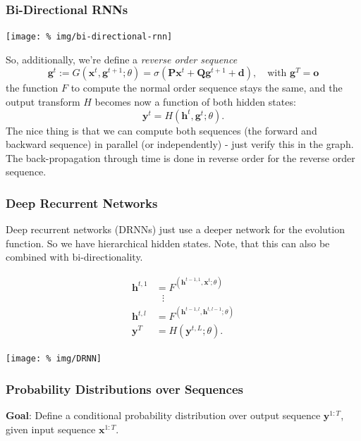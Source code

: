 \documentclass[a2paper,8pt]{extarticle}
\newcommand{\mat}[1]{\mathbf{#1}}
\renewcommand{\vec}[1]{\mathbf{#1}}
\newcommand{\vd}{\vec{d}}
\newcommand{\vg}{\vec{g}}
\newcommand{\vh}{\vec{h}}
\newcommand{\vo}{\vec{o}}
\newcommand{\vx}{\vec{x}}
\newcommand{\vy}{\vec{y}}
\newcommand{\MP}{\mat{P}}
\newcommand{\MQ}{\mat{Q}}
\begin{document}
\begin{landscape}
\begin{multicols*}{7}
\subsubsection{Bi-Directional RNNs}

\begin{center}
  \texttt{[image: \%
img/bi-directional-rnn]}
\end{center}

So, additionally, we're define a \emph{reverse order sequence}
\[
\vg^t:=G(\vx^t,\vg^{t+1};\theta)=\sigma(\MP\vx^t+\MQ\vg^{t+1}+\vd),
\quad\text{with }\vg^T=\vo
\]
the function $F$ to compute the normal order sequence stays the same, and the
output transform $H$ becomes now a function of both hidden states:
\[
\vy^t=H(\vh^t,\vg^t;\theta).
\]
The nice thing is that we can compute both sequences (the forward and backward
sequence) in parallel (or independently) - just verify this in the graph. The
back-propagation through time is done in reverse order for the reverse order
sequence.

\subsubsection{Deep Recurrent Networks}

Deep recurrent networks (DRNNs) just use a deeper network for the evolution
function. So we have hierarchical hidden states. Note, that this can also be
combined with bi-directionality.

\begin{multicols}{2}
\begin{align*}
\vh^{t,1}&=F^(\vh^{t-1,1},\vx^t;\theta)\\
&\,\,\,\,\vdots\\
\vh^{t,l}&=F^(\vh^{t-1,l},\vh^{t,l-1};\theta)\\
\vy^T&=H(\vy^{t,L};\theta).
\end{align*}
\begin{center}
  \texttt{[image: \%
img/DRNN]}
\end{center}
\end{multicols}





\subsubsection{Probability Distributions over Sequences}

\textbf{Goal}: Define a conditional probability distribution over output
sequence $\vy^{1:T}$, given input sequence $\vx^{1:T}$.


\end{multicols*}
\end{landscape}
\end{document}
